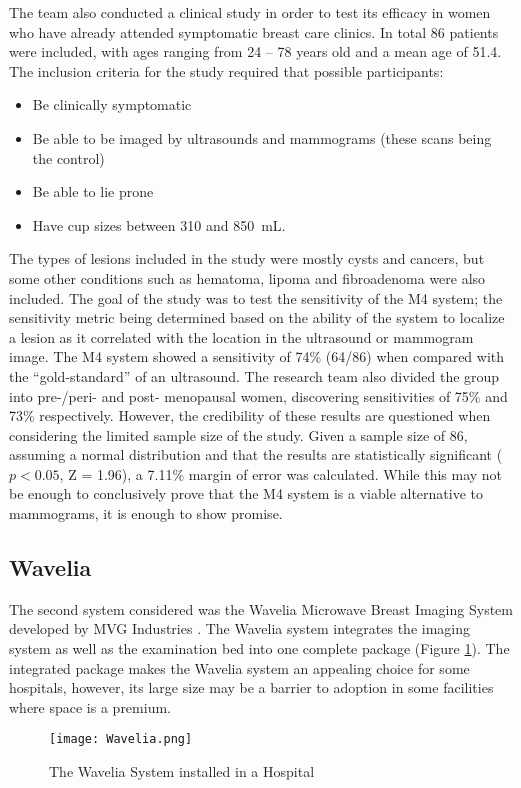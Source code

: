 The team also conducted a clinical study in order to test its efficacy in women who have already attended symptomatic
breast care clinics. In total 86 patients were included, with ages ranging from 24 -- 78 years old and a mean age of
51.4. The inclusion criteria for the study required that possible participants:
\begin{itemize}
    \item Be clinically symptomatic
    \item Be able to be imaged by ultrasounds and mammograms (these scans being the control)
    \item Be able to lie prone
    \item Have cup sizes between 310 and 850~mL.
\end{itemize}
The types of lesions included in the study were mostly cysts and cancers, but some other conditions such as hematoma,
lipoma and fibroadenoma were also included. The goal of the study was to test the sensitivity of the M4 system; the
sensitivity metric being determined based on the ability of the system to localize a lesion as it correlated with the
location in the ultrasound or mammogram image. The M4 system showed a sensitivity of 74\% (64/86) when compared with the
``gold-standard'' of an ultrasound. The research team also divided the group into pre-/peri- and post- menopausal women,
discovering sensitivities of 75\% and 73\% respectively. However, the credibility of these results are questioned when
considering the limited sample size of the study. Given a sample size of 86, assuming a normal distribution and that the
results are statistically significant ($p < 0.05$, Z = 1.96), a 7.11\% margin of error was calculated. While this may
not be enough to conclusively prove that the M4 system is a viable alternative to mammograms, it is enough to show
promise.

\subsection{Wavelia}
The second system considered was the Wavelia Microwave Breast Imaging System developed by MVG Industries
\cite{moloneyWaveliaMicrowaveBreast2021}. The Wavelia system integrates the imaging system as well as the examination
bed into one complete package (Figure \ref{fig:WaveliaSystem}). The integrated package makes the Wavelia system an
appealing choice for some hospitals, however, its large size may be a barrier to adoption in some facilities where space
is a premium.
\begin{figure}[!h]
    \texttt{[image: Wavelia.png]}
    \centering
    \caption{The Wavelia System installed in a Hospital \cite{moloneyWaveliaMicrowaveBreast2021}}
    \label{fig:WaveliaSystem}
\end{figure}

